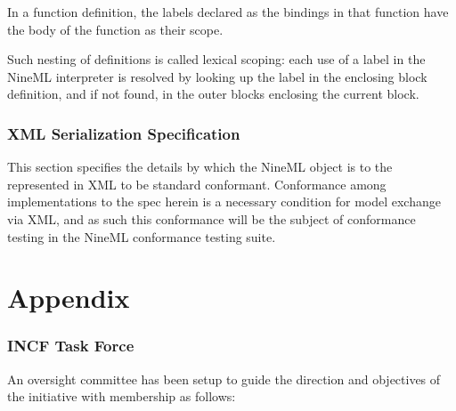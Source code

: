 \documentclass[a4paper]{article}
\begin{document}
In a function definition, the labels declared as the bindings in that
function have the body of the function as their scope.

Such nesting of definitions is called lexical scoping: each use of a
label in the NineML interpreter is resolved by looking up the label in
the enclosing block definition, and if not found, in the outer blocks
enclosing the current block.


\section{XML Serialization Specification}
This section specifies the details by which the NineML object is to
the represented in XML to be standard conformant.  Conformance among
implementations to the spec herein is a necessary condition for model
exchange via XML, and as such this conformance will be the subject of
conformance testing in the NineML conformance testing suite.
 


\newpage


\appendix


\part*{Appendix}

\section{INCF Task Force}

An oversight committee has been setup to guide the direction and
objectives of the initiative with membership as follows:
\end{document}

